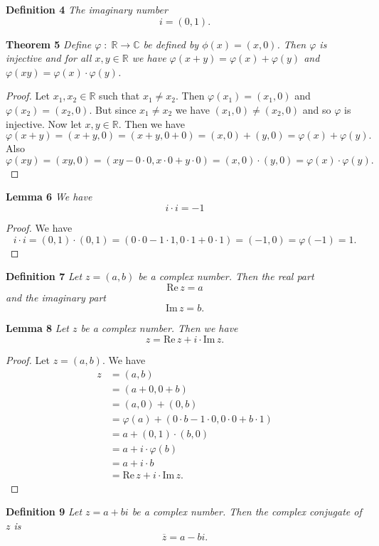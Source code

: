 \documentclass{article}
\begin{document}
\begin{flushleft}
\textbf{Definition 4}
\textsl{The imaginary number
\[
i = (0,1).
\]}\newline

\textbf{Theorem 5}
\textsl{Define $\varphi \; : \; \mathbb{R} \rightarrow \mathbb{C}$ be defined by $\phi (x) = (x,0)$. Then $\varphi$ is injective and for all $x,y \in \mathbb{R}$ we have $\varphi (x+y) = \varphi (x) + \varphi (y)$ and $\varphi (xy) = \varphi(x) \cdot \varphi (y)$.}
\begin{proof}
Let $x_1, x_2 \in \mathbb{R}$ such that $x_1 \neq x_2$. Then $\varphi (x_1) = (x_1, 0)$ and $\varphi (x_2) = (x_2, 0)$. But since $x_1 \neq x_2$ we have $(x_1, 0) \neq (x_2, 0)$ and so $\varphi$ is injective. Now let $x,y \in \mathbb{R}$. Then we have
\[
\varphi (x+y) = (x+y,0) = (x+y,0+0) = (x,0) + (y,0) = \varphi (x) + \varphi (y).
\]
Also
\[
\varphi (xy) = (xy,0) = (xy - 0 \cdot 0, x \cdot 0 + y \cdot 0) = (x,0) \cdot (y,0) = \varphi (x) \cdot \varphi (y).
\]
\end{proof}

\textbf{Lemma 6}
\textsl{We have
\[
i \cdot i = -1
\]}
\begin{proof}
We have
\[
i \cdot i = (0,1) \cdot (0,1) = (0\cdot 0 - 1 \cdot 1, 0 \cdot 1 + 0 \cdot 1) = (-1,0) = \varphi (-1) = 1.
\]
\end{proof}

\textbf{Definition 7}
\textsl{Let $z = (a,b)$ be a complex number. Then the real part
\[
\text{Re} \, z = a
\]
and the imaginary part
\[
\text{Im} \, z = b.
\]}\newline

\textbf{Lemma 8}
\textsl{Let $z$ be a complex number. Then we have
\[
z = \text{Re} \, z + i \cdot \text{Im} \, z.
\]}
\begin{proof}
Let $z = (a,b)$. We have
\begin{align*}
z &= (a,b) \\
  &= (a+0,0+b) \\
  & = (a,0) + (0,b) \\
  &= \varphi (a) + (0 \cdot b - 1 \cdot 0, 0 \cdot 0 + b \cdot 1) \\
  &= a + (0,1) \cdot (b,0) \\
  &= a + i \cdot \varphi (b) \\
  & = a + i \cdot b \\
  & = \text{Re} \, z + i \cdot \text{Im} \, z.
\end{align*}
\end{proof}

\textbf{Definition 9}
\textsl{Let $z = a + bi$ be a complex number. Then the complex conjugate of $z$ is
\[
\overline{z} = a - bi.
\]}\newline


\end{flushleft}
\end{document}
